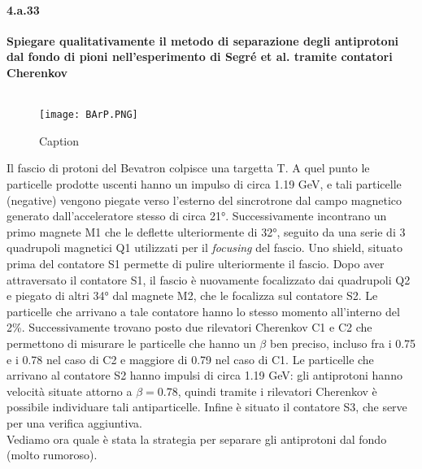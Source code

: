 \documentclass[twoside]{article}
\begin{document}
\paragraph{4.a.33} \textbf{Spiegare qualitativamente il metodo di separazione degli antiprotoni dal fondo di pioni nell’esperimento di Segré et al. tramite contatori Cherenkov}\\ \\
\begin{figure}[H]
    \centering
    \texttt{[image: BArP.PNG]}
    \caption{Caption}
\end{figure}

Il fascio di protoni del Bevatron colpisce una targetta T. A quel punto le particelle prodotte uscenti hanno un impulso di circa 1.19 GeV, e tali particelle (negative) vengono piegate verso l'esterno del sincrotrone dal campo magnetico generato dall'acceleratore stesso di circa 21°. Successivamente incontrano un primo magnete M1 che le deflette ulteriormente di 32°, seguito da una serie di 3 quadrupoli magnetici Q1 utilizzati per il \emph{focusing} del fascio. Uno shield, situato prima del contatore S1 permette di pulire ulteriormente il fascio. Dopo aver attraversato il contatore S1, il fascio è nuovamente focalizzato dai quadrupoli Q2 e piegato di altri 34° dal magnete M2, che le focalizza sul contatore S2. Le particelle che arrivano a tale contatore hanno lo stesso momento all'interno del 2\%. Successivamente trovano posto due rilevatori Cherenkov C1 e C2 che permettono di misurare le particelle che hanno un $\beta$ ben preciso, incluso fra i 0.75 e i 0.78 nel caso di C2 e maggiore di 0.79 nel caso di C1. Le particelle che arrivano al contatore S2 hanno impulsi di circa 1.19 GeV: gli antiprotoni hanno velocità situate attorno a $\beta = 0.78$, quindi tramite i rilevatori Cherenkov è possibile individuare tali antiparticelle.
Infine è situato il contatore S3, che serve per una verifica aggiuntiva.\\
Vediamo ora quale è stata la strategia per separare gli antiprotoni dal fondo (molto rumoroso).
\end{document}

